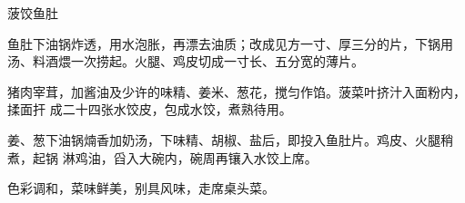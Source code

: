 \begin{recipe}{菠饺鱼肚}

\ingredients


\preparation

\step 鱼肚下油锅炸透，用水泡胀，再漂去油质；改成见方一寸、厚三分的片，下锅用
汤、料酒煨一次捞起。火腿、鸡皮切成一寸长、五分宽的薄片。

猪肉宰茸，加酱油及少许的味精、姜米、葱花，搅匀作馅。菠菜叶挤汁入面粉内，揉面扞
成二十四张水饺皮，包成水饺，煮熟待用。

姜、葱下油锅煵香加奶汤，下味精、胡椒、盐后，即投入鱼肚片。鸡皮、火腿稍煮，起锅
淋鸡油，舀入大碗内，碗周再镶入水饺上席。

\features

色彩调和，菜味鲜美，别具风味，走席桌头菜。

\end{recipe}

